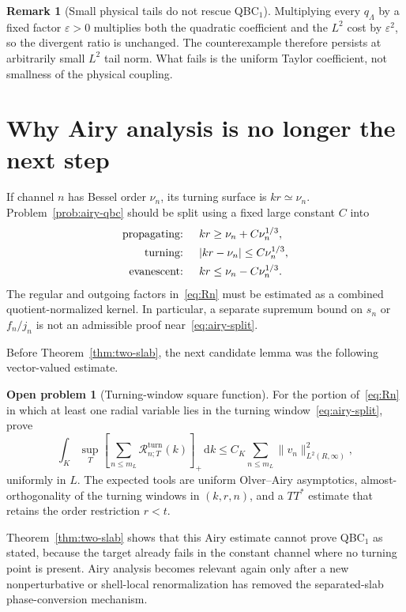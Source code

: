 \documentclass[11pt]{article}
\newcommand{\dd}{\,\mathrm d}
\newcommand{\cR}{\mathcal R}
\theoremstyle{definition}
\newtheorem{problem}[proposition]{Open problem}
\newtheorem{remark}[proposition]{Remark}
\begin{document}
\begin{remark}[Small physical tails do not rescue QBC$_1$]
Multiplying every $q_\Lambda$ by a fixed factor $\varepsilon>0$ multiplies both the quadratic coefficient and the $L^2$ cost by $\varepsilon^2$, so the divergent ratio is unchanged.  The counterexample therefore persists at arbitrarily small $L^2$ tail norm.  What fails is the uniform Taylor coefficient, not smallness of the physical coupling.
\end{remark}

\section{Why Airy analysis is no longer the next step}

If channel $n$ has Bessel order $\nu_n$, its turning surface is $kr\simeq\nu_n$.  Problem~\ref{prob:airy-qbc} should be split using a fixed large constant $C$ into
\begin{align}
 \text{propagating: }&\quad kr\geq\nu_n+C\nu_n^{1/3},\notag\\
 \text{turning: }&\quad |kr-\nu_n|\leq C\nu_n^{1/3},\label{eq:airy-split}\\
 \text{evanescent: }&\quad kr\leq\nu_n-C\nu_n^{1/3}.
\end{align}
The regular and outgoing factors in~\eqref{eq:Rn} must be estimated as a combined quotient-normalized kernel.  In particular, a separate supremum bound on $s_n$ or $f_n/j_n$ is not an admissible proof near~\eqref{eq:airy-split}.

Before Theorem~\ref{thm:two-slab}, the next candidate lemma was the following vector-valued estimate.

\begin{problem}[Turning-window square function]
For the portion of~\eqref{eq:Rn} in which at least one radial variable lies in the turning window~\eqref{eq:airy-split}, prove
\begin{equation}
 \int_K\sup_T
 \left[\sum_{n\leq m_L}\cR_{n;T}^{\mathrm{turn}}(k)\right]_+\dd k
 \leq C_K\sum_{n\leq m_L}\|v_n\|_{L^2(R,\infty)}^2,
 \label{eq:turning-square-function}
\end{equation}
uniformly in $L$.  The expected tools are uniform Olver--Airy asymptotics, almost-orthogonality of the turning windows in $(k,r,n)$, and a $TT^*$ estimate that retains the order restriction $r<t$.
\end{problem}

Theorem~\ref{thm:two-slab} shows that this Airy estimate cannot prove QBC$_1$ as stated, because the target already fails in the constant channel where no turning point is present.  Airy analysis becomes relevant again only after a new nonperturbative or shell-local renormalization has removed the separated-slab phase-conversion mechanism.
\end{document}
